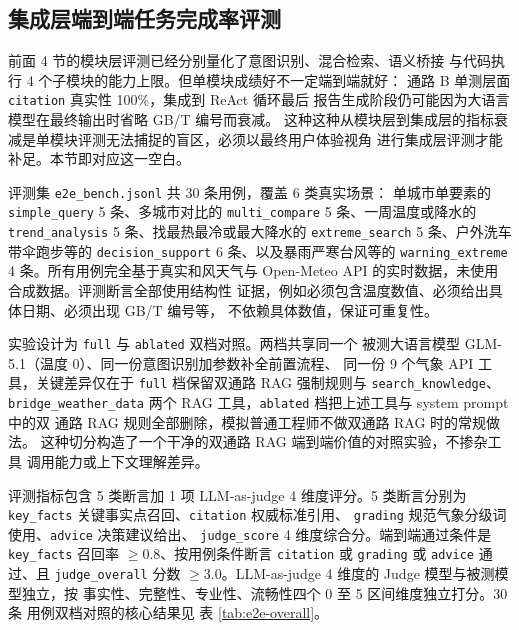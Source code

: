 \documentclass[a4paper]{article}
\theoremstyle{definition}
\theoremstyle{plain}
\theoremstyle{remark}
\newcommand{\reftab}[1]{表 \ref{#1}}
\newcommand{\bk}{\discretionary{}{}{}}
\begin{document}
\subsection{集成层端到端任务完成率评测}
\label{sec:e2e-eval}

前面 4 节的模块层评测已经分别量化了意图识别、混合检索、语义桥接
与代码执行 4 个子模块的能力上限。但单模块成绩好不一定端到端就好：
通路 B 单测层面 \texttt{citation} 真实性 100\%，集成到 ReAct 循环最后
报告生成阶段仍可能因为大语言模型在最终输出时省略 GB/T 编号而衰减。
这种这种从模块层到集成层的指标衰减是单模块评测无法捕捉的盲区，必须以最终用户体验视角
进行集成层评测才能补足。本节即对应这一空白。

评测集 \texttt{e2e\_\bk{}bench.\bk{}jsonl} 共 30 条用例，覆盖 6 类真实场景：
单城市单要素的 \texttt{simple\_\bk{}query} 5 条、多城市对比的
\texttt{multi\_\bk{}compare} 5 条、一周温度或降水的 \texttt{trend\_\bk{}analysis}
5 条、找最热最冷或最大降水的 \texttt{extreme\_\bk{}search} 5 条、户外洗车
带伞跑步等的 \texttt{decision\_\bk{}support} 6 条、以及暴雨严寒台风等的
\texttt{warning\_\bk{}extreme} 4 条。所有用例完全基于真实和风天气与
Open-Meteo API 的实时数据，未使用合成数据。评测断言全部使用结构性
证据，例如必须包含温度数值、必须给出具体日期、必须出现 GB/T 编号等，
不依赖具体数值，保证可重复性。

实验设计为 \texttt{full} 与 \texttt{ablated} 双档对照。两档共享同一个
被测大语言模型 GLM-5.1（温度 0）、同一份意图识别加参数补全前置流程、
同一份 9 个气象 API 工具，关键差异仅在于 \texttt{full} 档保留双通路
RAG 强制规则与 \texttt{search\_\bk{}knowledge}、\texttt{bridge\_\bk{}weather\_\bk{}data}
两个 RAG 工具，\texttt{ablated} 档把上述工具与 system prompt 中的双
通路 RAG 规则全部删除，模拟普通工程师不做双通路 RAG 时的常规做法。
这种切分构造了一个干净的双通路 RAG 端到端价值的对照实验，不掺杂工具
调用能力或上下文理解差异。

评测指标包含 5 类断言加 1 项 LLM-as-judge 4 维度评分。5 类断言分别为
\texttt{key\_\bk{}facts} 关键事实点召回、\texttt{citation} 权威标准引用、
\texttt{grading} 规范气象分级词使用、\texttt{advice} 决策建议给出、
\texttt{judge\_\bk{}score} 4 维度综合分。端到端通过条件是
\texttt{key\_\bk{}facts} 召回率 $\geq 0.8$、按用例条件断言 \texttt{citation}
或 \texttt{grading} 或 \texttt{advice} 通过、且 \texttt{judge\_\bk{}overall}
分数 $\geq 3.0$。LLM-as-judge 4 维度的 Judge 模型与被测模型独立，按
事实性、完整性、专业性、流畅性四个 0 至 5 区间维度独立打分。30 条
用例双档对照的核心结果见 \reftab{tab:e2e-overall}。
\end{document}
